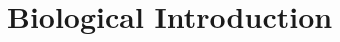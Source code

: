 \begin{comment}
A decoding algorithm is an algorithm that from the input sequence $X$ and HMM
$H$ computes the annotation of sequence $X$. The goal is to recover the true
annotation of $X$, but finding such an annotation is impossible due to the
randomness in the generating process. Therefore the decoding algorithm finds
some approximation of the true annotation.  In recent years different decoding
methods were developed to improve the quality of annotations
\cite{Gross2007,Nanasi2010,Nanasi2010mgr,Truszkowski2011}.  Additionally there
are many techniques that are used to lower the computational complexity of the
decoding and training algorithms (training algorithms are algorithms that
compute the parameters of the model from a training data set).

In the field of comparative analysis of biological sequences we focus on the
sequence alignment problem. A sequence alignment is a simple data format (or
data structure) that represents the similarities in the sequences. An alignment
is created by inserting dashes ('-') into both sequences in a way that the
sequences have the same length and similar symbols are on the same positions in
both sequences. In computational biology the alignments are constructed in a way
that the homologous parts of the sequences are aligned together. Homologous
sequences are sequences that have evolved from the same part of the sequence of
the ancestral organism.  The reason for searching and studying homologous
sequences is that homologous sequences are expected to have the same or similar
functions in both organisms.  Therefore by studying homologous sequences we can
transfer knowledge about functions from one species to others.

Alignments can be created using a variant of hidden Markov model called
\abbreviation{pair hidden Markov model}{pHMM}. A pHMM  that generates three
objects: two sequences $X,Y$ and their alignment $A$.  By proper decoding method
we can obtain a good approximation of $A$ for given sequences $X$ and $Y$. Our
goal is to study decoding methods and models that are used for sequence
alignment in order to create software that will produce alignments with high
quality.

\end{comment}
\section{Biological Introduction}


